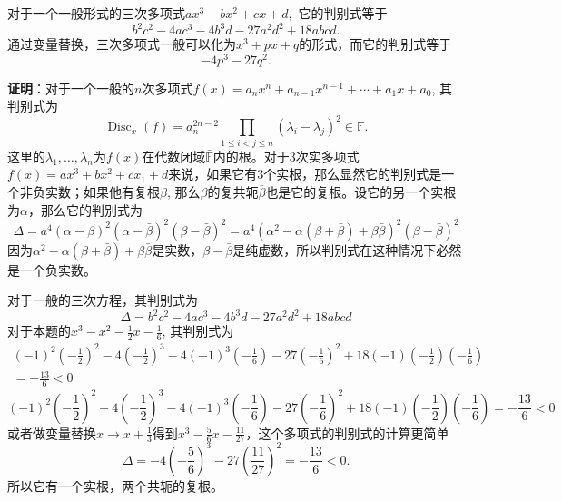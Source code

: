 对于一个一般形式的三次多项式$ax^3 + bx^2 + cx + d,$ 它的判别式等于
$$b^{2}c^{2}-4ac^{3}-4b^{3}d-27a^{2}d^{2}+18abcd.$$
通过变量替换，三次多项式一般可以化为$x^3 + px + q$的形式，而它的判别式等于
$$-4p^3 - 27q^2.$$

\ifIncludeAnswer

\newpageorvspace

{\bf 证明}：对于一个一般的$n$次多项式$f(x) = a_{n}x^{n}+a_{n-1}x^{n-1}+\cdots +a_{1}x+a_{0}$, 其判别式为
$$\operatorname{Disc}_x(f) = a_n^{2n-2} \prod_{1 \leqslant i < j \leqslant n} (\lambda_i - \lambda_j)^2 \in \mathbb{F}.$$
这里的$\lambda_1, \ldots, \lambda_n$为$f(x)$在代数闭域$\bar{\mathbb{F}}$内的根。对于3次实多项式$f(x) = ax^3+bx^2+cx_1+d$来说，如果它有3个实根，那么显然它的判别式是一个非负实数；如果他有复根$\beta$, 那么$\beta$的复共轭$\bar{\beta}$也是它的复根。设它的另一个实根为$\alpha$，那么它的判别式为
$$\Delta = a^4 (\alpha-\beta)^2(\alpha-\bar{\beta})^2(\beta-\bar{\beta})^2 = a^4 (\alpha^2-\alpha(\beta+\bar{\beta})+\beta\bar{\beta})^2 (\beta-\bar{\beta})^2$$
因为$\alpha^2-\alpha(\beta+\bar{\beta})+\beta\bar{\beta}$是实数，$\beta-\bar{\beta}$是纯虚数，所以判别式在这种情况下必然是一个负实数。

对于一般的三次方程，其判别式为
$$\Delta = b^{2}c^{2}-4ac^{3}-4b^{3}d-27a^{2}d^{2}+18abcd$$
对于本题的$x^3 - x^2 - \frac{1}{2}x - \frac{1}{6}$, 其判别式为
\ifLargeLayout
\begin{multline*}
(-1)^2(-\frac{1}{2})^2 - 4(-\frac{1}{2})^3 - 4(-1)^3(-\frac{1}{6}) - 27(-\frac{1}{6})^2 + 18(-1)(-\frac{1}{2})(-\frac{1}{6}) \\
= -\frac{13}{6} < 0
\end{multline*}
\else
$$(-1)^2(-\frac{1}{2})^2 - 4(-\frac{1}{2})^3 - 4(-1)^3(-\frac{1}{6}) - 27(-\frac{1}{6})^2 + 18(-1)(-\frac{1}{2})(-\frac{1}{6}) = -\frac{13}{6} < 0$$
\fi  %
或者做变量替换$x\to x+\frac{1}{3}$得到$x^{3} - \frac{5}{6}x - \frac{11}{27}$，这个多项式的判别式的计算更简单
$$\Delta = -4(-\frac{5}{6})^3 - 27 (\frac{11}{27})^2 = -\frac{13}{6} < 0.$$
所以它有一个实根，两个共轭的复根。

\fi  %








